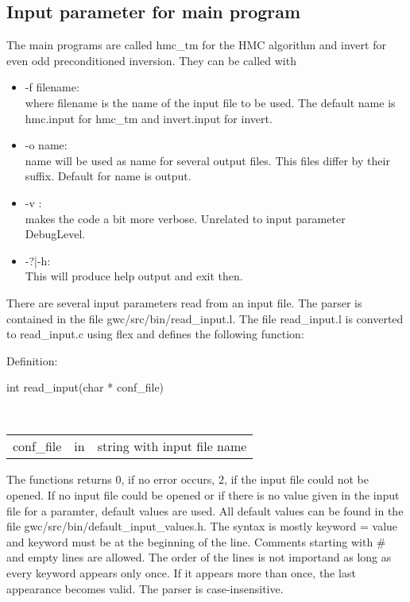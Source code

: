 \subsection{Input parameter for main program}

The main programs are called {\ttfamily hmc\_tm} for the HMC algorithm
and {\ttfamily invert} for even odd preconditioned inversion. They can
be called with
\begin{itemize}
\item {\ttfamily -f filename}:\\
  where {\ttfamily filename} is the name of the input file to be
  used. The default name is {\ttfamily hmc.input} for
  {\ttfamily hmc\_tm} and {\ttfamily invert.input} for 
  {\ttfamily invert}.

\item {\ttfamily -o name}:\\
  {\ttfamily name} will be used as name for several output files. This
  files differ by their suffix. Default for {\ttfamily name} is
  {\ttfamily output}.

\item {\ttfamily -v  }:\\
  makes the code a bit more verbose. Unrelated to input parameter
  {\ttfamily DebugLevel}.

\item {\ttfamily -?|-h}:\\
  This will produce help output and exit then.

\end{itemize}

There are several input parameters read from an input file. The parser
is contained in the file {\ttfamily gwc/src/bin/read\_input.l}. The
file {\ttfamily read\_input.l} is converted to {\ttfamily
  read\_input.c} using {\ttfamily flex} and defines the following
function: 

Definition:\\
\begin{ttfamily}
  int read\_input(char * conf\_file)
\end{ttfamily}\\

\begin{tabular}[h]{l l l}
{\ttfamily conf\_file} & in & string with input file name\\ 
\end{tabular}

The functions returns $0$, if no error occurs, $2$, if the input file
could not be opened. If no input file could be opened or if there is
no value given in the input file for a paramter, default values are
used. All default values can be found in the file {\ttfamily
  gwc/src/bin/default\_input\_values.h}. The syntax is mostly
{\ttfamily keyword = value} and {\ttfamily keyword} must be at the
beginning of the line. Comments starting with {\ttfamily \#} and empty
lines are allowed. The order of the lines is not importand as long as
every keyword appears only once.  If it appears more than once, the
last appearance becomes valid. The parser is case-insensitive.

